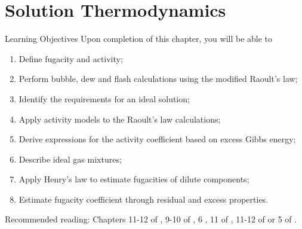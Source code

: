 \chapter{Solution Thermodynamics}\label{Chapter:SolutionThermodynamics}


   \begin{LearningObjectivesBlock}{Learning Objectives}
      Upon completion of this chapter, you will be able to
        \begin{enumerate}
           \item Define fugacity and activity;
           \item Perform bubble, dew and flash calculations using the modified Raoult's law;
           \item Identify the requirements for an ideal solution;
           \item Apply activity models to the Raoult's law calculations;
           \item Derive expressions for the activity coefficient based on excess Gibbs energy;
           \item Describe ideal gas mixtures;
           \item Apply Henry's law to estimate fugacities of dilute components;
           \item Estimate fugacity coefficient through residual and excess properties.
        \end{enumerate}
\medskip
     Recommended reading: Chapters 11-12 of \citet{SmithVanNess_Book}, 9-10 of \cite{Sandler_Book}, 6 \citet{Lue_Book}, 11 of \citet{Elliot_Book}, 11-12 of \citet{Devoe_Book} or 5 of \citet{Atkins_Book}.
   \end{LearningObjectivesBlock}


\begin{comment}
   \begin{LearningObjectivesBlock}{Learning Objectives}
      Upon completion of this chapter, you will be able to
        \begin{enumerate}
           \item {\bf Knowledge:} Define, Name, Select, State 
           \item {\bf Comprehension:} Describe, Identify, Discuss
           \item {\bf Application:} Apply, Demonstrate, Employ, Sketch
           \item {\bf Analysis:} Analyse, Compare, Calculate, Solve
           \item {\bf Synthesis:} Determine, Formulate
           \item {\bf Evaluation:} Assess, Check, Estimate, Compare, Measure, Monitor
        \end{enumerate}
\end{comment}

